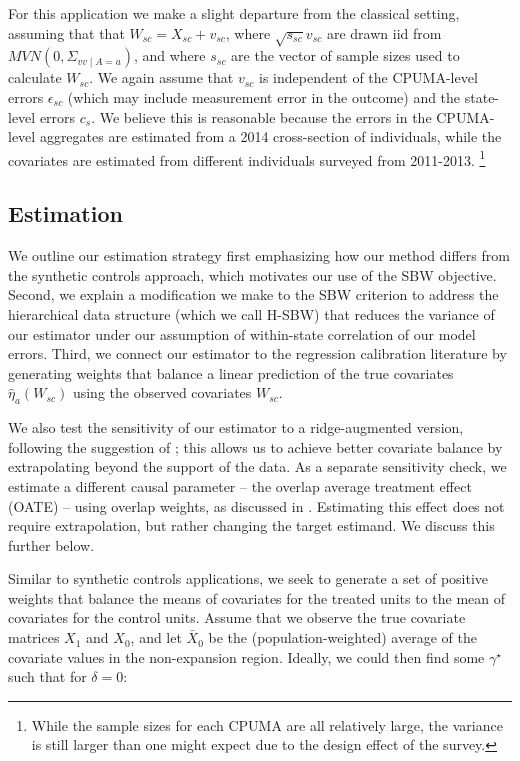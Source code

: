 \documentclass[12pt]{article}
\begin{document}
For this application we make a slight departure from the classical setting, assuming that that $W_{sc} = X_{sc} + v_{sc}$, where $\sqrt{s_{sc}}v_{sc}$ are drawn iid from $MVN(0, \Sigma_{vv \mid A = a})$, and where $s_{sc}$ are the vector of sample sizes used to calculate $W_{sc}$. We again assume that $v_{sc}$ is independent of the CPUMA-level errors $\epsilon_{sc}$ (which may include measurement error in the outcome) and the state-level errors $c_s$. We believe this is reasonable because the errors in the CPUMA-level aggregates are estimated from a 2014 cross-section of individuals, while the covariates are estimated from different individuals surveyed from 2011-2013. \footnote{While the sample sizes for each CPUMA are all relatively large, the variance is still larger than one might expect due to the design effect of the survey.} 

\subsection{Estimation}

We outline our estimation strategy first emphasizing how our method differs from the synthetic controls approach, which motivates our use of the SBW objective. Second, we explain a modification we make to the SBW criterion to address the hierarchical data structure (which we call H-SBW) that reduces the variance of our estimator under our assumption of within-state correlation of our model errors. Third, we connect our estimator to the regression calibration literature by generating weights that balance a linear prediction of the true covariates $\hat{\eta}_a(W_{sc})$ using the observed covariates $W_{sc}$. 

We also test the sensitivity of our estimator to a ridge-augmented version, following the suggestion of \cite{ben2018augmented}; this allows us to achieve better covariate balance by extrapolating beyond the support of the data. As a separate sensitivity check, we estimate a different causal parameter -- the overlap average treatment effect (OATE) -- using overlap weights, as discussed in \cite{li2018balancing}. Estimating this effect does not require extrapolation, but rather changing the target estimand. We discuss this further below.

Similar to synthetic controls applications, we seek to generate a set of positive weights that balance the means of covariates for the treated units to the mean of covariates for the control units. Assume that we observe the true covariate matrices $X_1$ and $X_0$, and let $\bar{X}_0$ be the (population-weighted) average of the covariate values in the non-expansion region. Ideally, we could then find some $\gamma^\star$ such that for $\delta = 0$: 
\end{document}
